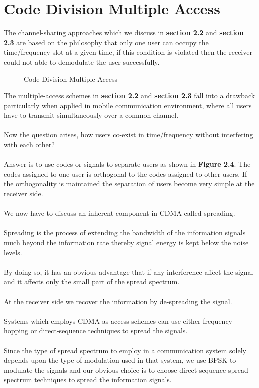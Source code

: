 \section{Code Division Multiple Access}
The channel-sharing approaches which we discuss in \textbf{section 2.2} and \textbf{section 2.3} are based on the philosophy that only one user can occupy the time/frequency slot at a given time, if this condition is violated then the receiver could not able to demodulate the user successfully.
\begin{figure}[htb]
  \centerline{  }
  \caption{Code Division Multiple Access}
\end{figure}
The multiple-access schemes in \textbf{section 2.2} and \textbf{section 2.3} fall into a drawback particularly when applied in mobile communication environment, where all users have to transmit simultaneously over a common channel. \\ \\
Now the question arises, how users co-exist in time/frequency without interfering with each other? \\ \\
Answer is to use codes or signals to separate users as shown in \textbf{Figure 2.4}. The codes assigned to one user is orthogonal to the codes assigned to other users. If the orthogonality is maintained the separation of users become very simple at the receiver side.\\\\
We now have to discuss an inherent component in CDMA called spreading. \\ \\
Spreading is the process of extending the bandwidth of the information signals much beyond the information rate thereby signal energy is kept below the noise levels. \\ \\
By doing so, it has an obvious advantage that if any interference affect the signal and it affects only the small part of the spread spectrum.\\ \\
At the receiver side we recover the information by de-spreading the signal.\\ \\
Systems which employs CDMA as access schemes can use either frequency hopping or direct-sequence techniques to spread the signals. \\ \\
Since the type of spread spectrum to employ in a communication system solely depends upon the type of modulation used in that system, we use BPSK to modulate the signals and our obvious choice is to choose direct-sequence spread spectrum techniques to spread the information signals.
